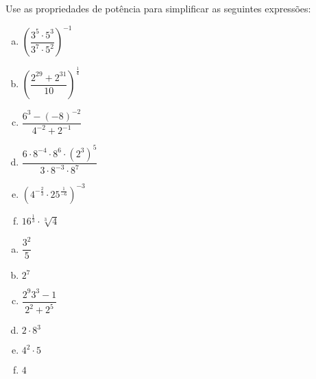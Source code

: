 \begin{secExercicios}
\begin{exer}
 Use as propriedades de potência para simplificar as seguintes expressões:
\begin{multicols}{2}
\begin{enumerate}[a)]
\item $\left( \dfrac{3^5 \cdot 5^3}{3^7 \cdot 5^2} \right)^{-1}$
\item $\left( \dfrac{2^{29} + 2^{31}}{10} \right)^{\frac{1}{4}}$
\item $\dfrac{6^3 - (-8)^{-2}}{4^{-2} + 2^{-1}}$
\item $\dfrac{6 \cdot 8^{-4} \cdot 8^{6} \cdot (2^3)^{5}}{3 \cdot 8^{-3} \cdot 8^{7}}$
\item $\left(4^{-\frac{2}{3}} \cdot 25^{\frac{1}{-6}}\right)^{-3}$
\item $16^{\frac{1}{3}} \cdot \sqrt[3]{4}$
\end{enumerate}
\end{multicols}
\end{exer}
\begin{resp}
\begin{multicols}{3}
\begin{enumerate}[a)]
\item $\dfrac{3^2}{5}$
\item $2^{7}$
\item $\dfrac{2^9 3^3 - 1}{2^{2} + 2^{5}}$
\item $2 \cdot 8^3$
\item $4^2 \cdot 5$
\item $4$
\end{enumerate}
\end{multicols}
\end{resp}


\end{secExercicios}
